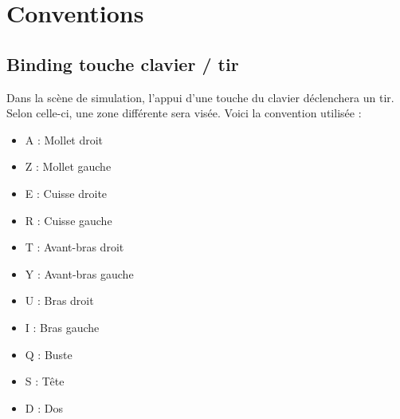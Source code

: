 \chapter{Conventions} 
\label{ch:conventions}

\section{Binding touche clavier / tir}

Dans la scène de simulation, l'appui d'une touche du clavier déclenchera un tir. Selon celle-ci, une zone différente sera visée. Voici la convention utilisée : 
\begin{itemize}
	\item A : Mollet droit
	\item Z : Mollet gauche
	\item E : Cuisse droite
	\item R : Cuisse gauche
	\item T : Avant-bras droit
	\item Y : Avant-bras gauche
	\item U : Bras droit
	\item I : Bras gauche
	\item Q : Buste
	\item S : Tête
	\item D : Dos
\end{itemize}

